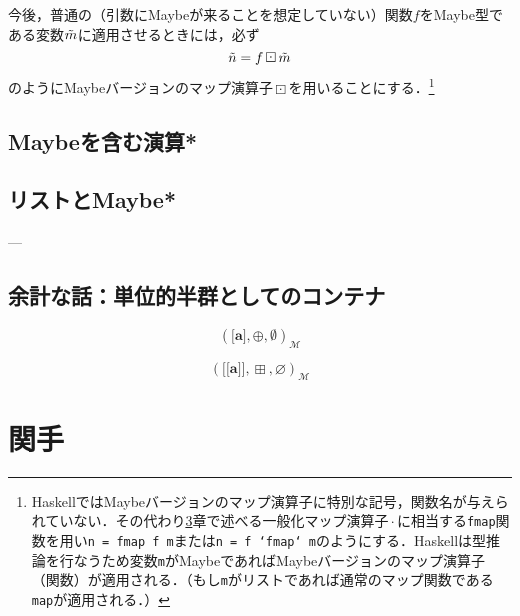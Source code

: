 \documentclass[twocolumn]{jsbook}
\def\[{[\![}
\def\]{]\!]}
\newcommand{\code}[1]{\texttt{#1}}
\newcommand{\hsklType}[1]{\textbf{#1}}
\DeclareMathOperator{\hsklFmap}{\cdot}
\DeclareMathOperator{\hsklMaybeAppend}{\boxplus}
\DeclareMathOperator{\hsklMaybeMap}{\boxdot}
\newcommand{\hsklAppend}{\oplus}
\newcommand{\hsklEmptyList}{\emptyset}
\newcommand{\hsklNothing}{\varnothing}
\newcommand{\hsklListType}[1]{\boldsymbol{[}#1\boldsymbol{]}}
\newcommand{\hsklMaybe}[1]{\Tilde{#1}}
\newcommand{\hsklMaybeType}[1]{\boldsymbol{\[}#1\boldsymbol{\]}}
\newcommand{\mathMonoid}[3]{(#1,#2,#3)_\mathcal{M}}
\begin{document}
今後，普通の（引数にMaybeが来ることを想定していない）関数$f$をMaybe型である変数$\hsklMaybe{m}$に適用させるときには，必ず$$\hsklMaybe{n}=f\hsklMaybeMap\hsklMaybe{m}$$のようにMaybeバージョンのマップ演算子$\hsklMaybeMap$を用いることにする．\footnote{HaskellではMaybeバージョンのマップ演算子に特別な記号，関数名が与えられていない．その代わり\ref{ch:functor}章で述べる一般化マップ演算子$\hsklFmap$に相当する\code{fmap}関数を用い\code{n = fmap f m}または\code{n = f `fmap` m}のようにする．Haskellは型推論を行なうため変数\code{m}がMaybeであればMaybeバージョンのマップ演算子（関数）が適用される．（もし\code{m}がリストであれば通常のマップ関数である\code{map}が適用される．）}



\section{Maybeを含む演算*}

\section{リストとMaybe*}

---


\section*{余計な話：単位的半群としてのコンテナ}

$$\mathMonoid{\hsklListType{\hsklType{a}}}{\hsklAppend}{\hsklEmptyList}$$

$$\mathMonoid{\hsklMaybeType{\hsklType{a}}}{\hsklMaybeAppend}{\hsklNothing}$$





\chapter{関手}
\label{ch:functor}
\end{document}
